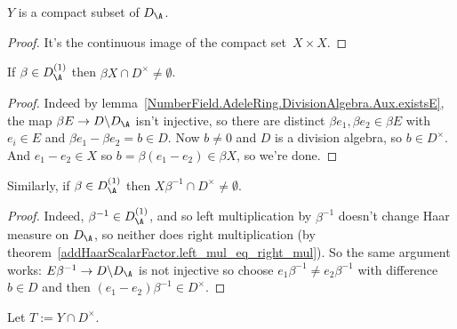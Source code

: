 \begin{lemma}
  \label{NumberField.AdeleRing.DivisionAlgebra.Aux.Y_compact}
  $Y$ is a compact subset of $D_{\A}$.
\end{lemma}
\begin{proof}
  It's the continuous image of the compact set~$X\times X$.
\end{proof}

\begin{lemma}
  \label{NumberField.AdeleRing.DivisionAlgebra.Aux.X_meets_kernel}
  If $\beta\in D_{\A}^{(1)}$ then
$\beta X\cap D^\times\not=\emptyset$.
\end{lemma}
\begin{proof}
Indeed by lemma~\ref{NumberField.AdeleRing.DivisionAlgebra.Aux.existsE},
the map $\beta E\to D\backslash D_{\A}$
isn't injective, so there are distinct
$\beta e_1,\beta e_2\in \beta E$ with $e_i\in E$ and
$\beta e_1-\beta e_2=b\in D$.
Now $b\not=0$ and $D$ is a division algebra, so $b\in D^\times$.
And $e_1-e_2\in X$ so $b=\beta(e_1-e_2)\in \beta X$, so we're done.
\end{proof}

\begin{lemma}
  \label{NumberField.AdeleRing.DivisionAlgebra.Aux.X_meets_kernel'}
  Similarly, if $\beta\in D_{\A}^{(1)}$ then
  $X\beta^{-1}\cap D^\times\not=\emptyset$.
\end{lemma}
\begin{proof}
  Indeed, $\beta^{-1}\in D_{\A}^{(1)}$, and so left multiplication by $\beta^{-1}$
  doesn't change Haar measure on $D_{\A}$, so neither does right multiplication
  (by theorem~\ref{addHaarScalarFactor.left_mul_eq_right_mul}).
  So the same argument works: $E\beta^{-1}\to D\backslash D_{\A}$ is not
  injective so choose $e_1\beta^{-1}\not=e_2\beta^{-1}$ with difference $b\in D$
  and then $(e_1-e_2)\beta^{-1}\in D^\times$.
\end{proof}

\begin{definition}
  \label{NumberField.AdeleRing.DivisionAlgebra.Aux.T}
  Let $T:=Y\cap D^\times$.
\end{definition}

